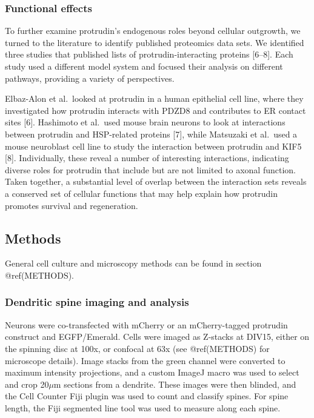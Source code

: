 \documentclass[
  12pt,
  a4paper,
]{article}
\begin{document}
\hypertarget{functional-effects}{%
\subsubsection{Functional effects}\label{functional-effects}}

To further examine protrudin's endogenous roles beyond cellular
outgrowth, we turned to the literature to identify published proteomics
data sets. We identified three studies that published lists of
protrudin-interacting proteins {[}6--8{]}. Each study used a different
model system and focused their analysis on different pathways, providing
a variety of perspectives.

Elbaz-Alon et al.~looked at protrudin in a human epithelial cell line,
where they investigated how protrudin interacts with PDZD8 and
contributes to ER contact sites {[}6{]}. Hashimoto et al.~used mouse
brain neurons to look at interactions between protrudin and HSP-related
proteins {[}7{]}, while Matsuzaki et al.~used a mouse neuroblast cell
line to study the interaction between protrudin and KIF5 {[}8{]}.
Individually, these reveal a number of interesting interactions,
indicating diverse roles for protrudin that include but are not limited
to axonal function. Taken together, a substantial level of overlap
between the interaction sets reveals a conserved set of cellular
functions that may help explain how protrudin promotes survival and
regeneration.

\hypertarget{methods}{%
\subsection{Methods}\label{methods}}

General cell culture and microscopy methods can be found in section
@ref(METHODS).

\hypertarget{dendritic-spine-imaging-and-analysis}{%
\subsubsection{Dendritic spine imaging and
analysis}\label{dendritic-spine-imaging-and-analysis}}

Neurons were co-transfected with mCherry or an mCherry-tagged protrudin
construct and EGFP/Emerald. Cells were imaged as Z-stacks at DIV15,
either on the spinning disc at 100x, or confocal at 63x (see
@ref(METHODS) for microscope details). Image stacks from the green
channel were converted to maximum intensity projections, and a custom
ImageJ macro was used to select and crop 20\(\mu\)m sections from a
dendrite. These images were then blinded, and the Cell Counter Fiji
plugin was used to count and classify spines. For spine length, the Fiji
segmented line tool was used to measure along each spine.
\end{document}
